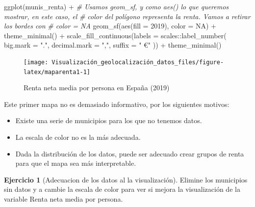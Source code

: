 \documentclass[
]{report}
\newenvironment{Shaded}{\begin{snugshade}}{\end{snugshade}}
\newcommand{\AttributeTok}[1]{\textcolor[rgb]{0.77,0.63,0.00}{#1}}
\newcommand{\CommentTok}[1]{\textcolor[rgb]{0.56,0.35,0.01}{\textit{#1}}}
\newcommand{\ConstantTok}[1]{\textcolor[rgb]{0.00,0.00,0.00}{#1}}
\newcommand{\FunctionTok}[1]{\textcolor[rgb]{0.00,0.00,0.00}{#1}}
\newcommand{\NormalTok}[1]{#1}
\newcommand{\SpecialCharTok}[1]{\textcolor[rgb]{0.00,0.00,0.00}{#1}}
\newcommand{\StringTok}[1]{\textcolor[rgb]{0.31,0.60,0.02}{#1}}
\theoremstyle{definition}
\theoremstyle{definition}
\theoremstyle{definition}
\newtheorem{exercise}{Ejercicio}[chapter]
\theoremstyle{definition}
\theoremstyle{remark}
\begin{document}
\begin{Shaded}
\begin{Highlighting}[]

\FunctionTok{ggplot}\NormalTok{(munis\_renta) }\SpecialCharTok{+}
  \CommentTok{\# Usamos geom\_sf, y como aes() lo que queremos mostrar, en este caso, el}
  \CommentTok{\# color del polígono representa la renta. Vamos a retirar los bordes con}
  \CommentTok{\# color = NA}
  \FunctionTok{geom\_sf}\NormalTok{(}\FunctionTok{aes}\NormalTok{(}\AttributeTok{fill =} \StringTok{\textasciigrave{}}\AttributeTok{2019}\StringTok{\textasciigrave{}}\NormalTok{), }\AttributeTok{color =} \ConstantTok{NA}\NormalTok{) }\SpecialCharTok{+}
  \FunctionTok{theme\_minimal}\NormalTok{() }\SpecialCharTok{+}
  \FunctionTok{scale\_fill\_continuous}\NormalTok{(}\AttributeTok{labels =}\NormalTok{ scales}\SpecialCharTok{::}\FunctionTok{label\_number}\NormalTok{(}
    \AttributeTok{big.mark =} \StringTok{"."}\NormalTok{,}
    \AttributeTok{decimal.mark =} \StringTok{","}\NormalTok{,}
    \AttributeTok{suffix =} \StringTok{" €"}
\NormalTok{  )) }\SpecialCharTok{+}
  \FunctionTok{theme\_minimal}\NormalTok{()}
\end{Highlighting}
\end{Shaded}

\begin{figure}

{\centering \texttt{[image: Visualización\_geolocalización\_datos\_files/figure-latex/maparenta1-1]} 

}

\caption{Renta neta media por persona en España (2019)}\label{fig:maparenta1}
\end{figure}

Este primer mapa no es demasiado informativo, por los siguientes motivos:

\begin{itemize}
\item
  Existe una serie de municipios para los que no tenemos datos.
\item
  La escala de color no es la más adecuada.
\item
  Dada la distribución de los datos, puede ser adecuado crear grupos de renta
  para que el mapa sea más interpretable.
\end{itemize}

\begin{exercise}[Adecuacion de los datos al la visualización]
\protect\hypertarget{exr:ex21}{}\label{exr:ex21}Elimine los municipios sin datos y a cambie la escala de color para ver si
mejora la visualización de la variable Renta neta media por persona.
\end{exercise}
\end{document}

